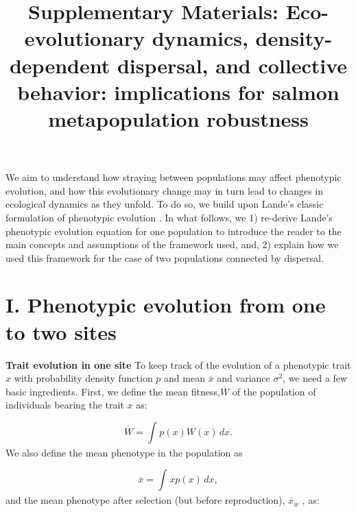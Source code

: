 \documentclass{revtex4}
\begin{document}
\title{Supplementary Materials: Eco-evolutionary dynamics, density-dependent dispersal, and collective behavior: implications for salmon metapopulation robustness}
\maketitle

We aim to understand how straying between populations may affect phenotypic evolution, and how this evolutionary change may in turn lead to changes in ecological dynamics as they unfold. 
To do so, we build upon Lande's classic formulation of phenotypic evolution \citep{Lande:1976ga}. In what follows, we  
1) re-derive Lande's phenotypic evolution equation for one population to introduce the reader to the main concepts and assumptions of the framework used, and,
2) explain how we used this framework for the case of two populations connected by dispersal.

\section*{I. Phenotypic evolution from one to two sites}

\textbf{Trait evolution in one site} To keep track of the evolution of a phenotypic trait $x$ with probability density function $p$ and mean $\overline{x}$ and variance $\sigma^{2}$, we need a few basic ingredients. First, we define the mean fitness,$\overline{W}$ of the population of individuals bearing the trait $x$ as:

\begin{equation}\label{1}
\overline{W}=\int_{} p(x)W(x)\,dx.
\end{equation}
We also define the mean phenotype in the population as  

\begin{equation}\label{2}
\overline{x}=\int_{} xp(x)\,dx,
\end{equation}
and the mean phenotype after selection (but before reproduction), $\overline{x}_{w}$ \cite{Falconer:1967tg}, as:
\end{document}
